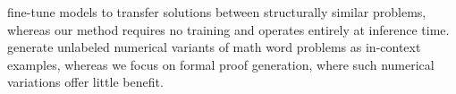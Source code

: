 \citet{zhou2025self} fine-tune models to transfer solutions between structurally similar problems, whereas our method requires no training and operates entirely at inference time. \citet{lee2025automatic} generate unlabeled numerical variants of math word problems as in-context examples, whereas we focus on formal proof generation, where such numerical variations offer little benefit.
